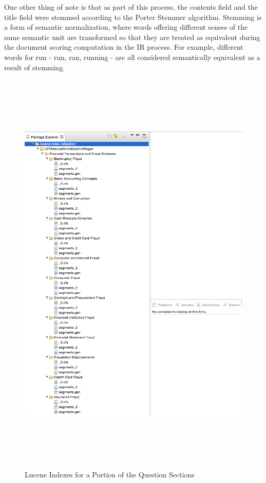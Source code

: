 One other thing of note is that as part of this process, the contents field and the title field were stemmed according to the Porter Stemmer algorithm.  Stemming is a form of semantic normalization, where words offering different senses of the same semantic unit are transformed so that they are treated as equivalent during the document scoring computation in the IR process.  For example, different words for run - run, ran, running - are all considered semantically equivalent as a result of stemming.

\begin{figure}
\centering
\vspace{1.0in}
\includegraphics[width=125mm, height=200mm]{lucene_indexes.png}
\caption{Lucene Indexes for a Portion of the Question Sections}
\label{fig:lucene_indexes}
\end{figure}



